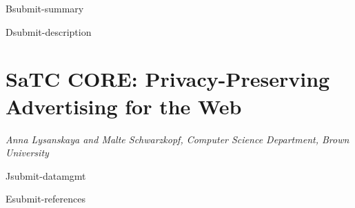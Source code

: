 \documentclass[11pt]{article}
\newcommand{\proptitle}{Privacy-Preserving Advertising for the Web}
\newcommand{\authoraffil}{Anna Lysanskaya and Malte Schwarzkopf, Computer Science Department, Brown University}
\begin{document}
\pagestyle{plain}

\begin{submit}{B}{submit-summary}

\end{submit}


\begin{submit}{D}{submit-description}

\section*{SaTC CORE: \proptitle{}}
{\em\authoraffil}
\medskip




%
%
%


\end{submit}

%

\begin{submit}{J}{submit-datamgmt}

\end{submit}

%

%

%

\begin{submit}{E}{submit-references}
{

\renewcommand{\refname}{{E}\quad References Cited}
\raggedright
%
%
\printbibliography

}
\end{submit}
\end{document}
